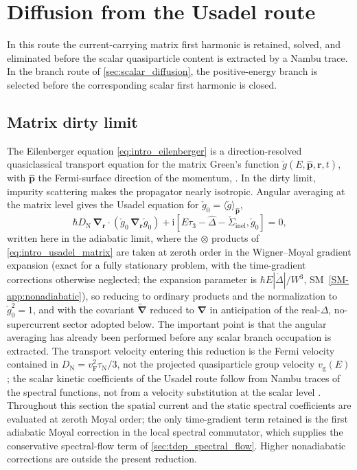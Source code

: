 \documentclass[
  aps,
  prb,
  preprint,
  superscriptaddress,
  longbibliography,
  nofootinbib
]{revtex4-2}
\newcommand{\ii}{\mathrm{i}}
\newcommand{\br}{\mathbf{r}}
\newcommand{\bp}{\mathbf{p}}
\newcommand{\bnabla}{\boldsymbol{\nabla}}
\newcommand{\vF}{v_{\mathrm{F}}}
\newcommand{\vg}{v_{\mathrm{g}}}
\newcommand{\DN}{D_{\mathrm{N}}}
\newcommand{\checkg}{\check{g}}
\newcommand{\hatD}{\hat{\Delta}}
\begin{document}
\section{Diffusion from the Usadel route}
\label{sec:usadel_route}

In this route the current-carrying matrix first harmonic is retained,
solved, and eliminated before the scalar quasiparticle content is extracted
by a Nambu trace. In the branch route of \cref{sec:scalar_diffusion}, the
positive-energy branch is selected before the corresponding scalar first
harmonic is closed.

\subsection{Matrix dirty limit}

The Eilenberger equation \cref{eq:intro_eilenberger} is a
direction-resolved quasiclassical transport equation for the matrix
Green's function \(\checkg(E,\hat{\bp},\br,t)\), with \(\hat{\bp}\) the
Fermi-surface direction of the momentum,
\cite{eilenberger1968,rammer1986,kopnin2001}. In the dirty limit, impurity
scattering makes the propagator nearly isotropic. Angular averaging at the
matrix level gives the Usadel equation \cite{usadel1970} for
\(\checkg_0=\langle\checkg\rangle_{\hat{\bp}}\),
\begin{equation}
  \hbar\DN\,
  \bnabla_{\br}\cdot
  \left(
    \checkg_0\,\bnabla_{\br}\checkg_0
  \right)
  +
  \ii\left[
    E\tau_3-\hatD-\check{\Sigma}_{\mathrm{inel}},
    \checkg_0
  \right]
  =
  0,
  \label{eq:matrix_usadel_schematic}
\end{equation}
written here in the adiabatic limit, where the \(\otimes\) products of
\cref{eq:intro_usadel_matrix} are taken at zeroth order in the
Wigner--Moyal gradient expansion (exact for a fully stationary problem,
with the time-gradient corrections otherwise neglected; the expansion
parameter is \(\hbar E|\dot\Delta|/W^3\), SM~\cref{SM-app:nonadiabatic}), so reducing to
ordinary products and the normalization to \(\checkg_0^2=1\), and with
the covariant \(\widetilde{\bnabla}\) reduced to \(\bnabla\) in
anticipation of the real-\(\Delta\), no-supercurrent sector adopted
below. The important point is that the
angular averaging has already been performed before any scalar branch
occupation is extracted. The transport velocity entering this reduction is the
Fermi velocity contained in \(\DN=\vF^2\tau_{\mathrm{N}}/3\), not the projected
quasiparticle group velocity \(\vg(E)\); the scalar kinetic
coefficients of the Usadel route follow from Nambu traces of the
spectral functions, not from a velocity substitution at the scalar
level \cite{schmid1980,belzig1999}. Throughout this section the spatial
current and the static spectral coefficients are evaluated at zeroth
Moyal order; the only time-gradient term retained is the first
adiabatic Moyal correction in the local spectral commutator, which
supplies the conservative spectral-flow term of
\cref{sec:tdep_spectral_flow}. Higher nonadiabatic corrections are
outside the present reduction.
\end{document}
